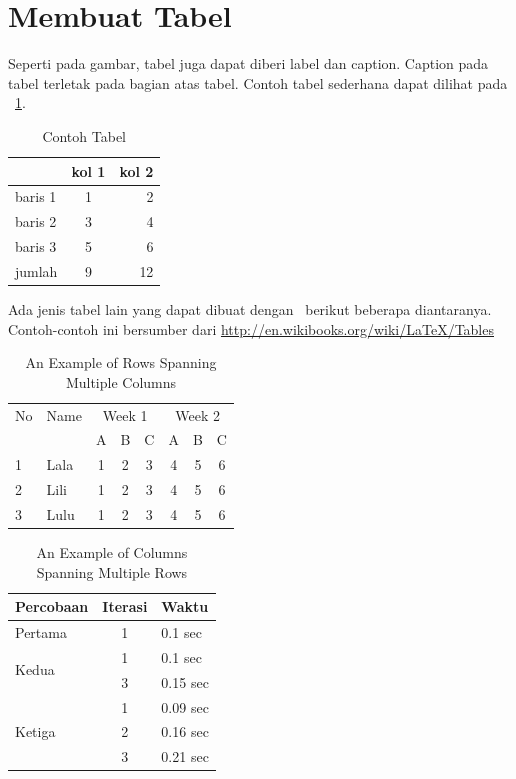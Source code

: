 \section{Membuat Tabel}
Seperti pada gambar, tabel juga dapat diberi label dan caption. 
Caption pada tabel terletak pada bagian atas tabel. 
Contoh tabel sederhana dapat dilihat pada \tab~\ref{tab:tab1}.

\begin{table}
	\centering
	\caption{Contoh Tabel}
	\label{tab:tab1}
	\begin{tabular}{| l | c r |}
		\hline
		& kol 1 & kol 2 \\ 
		\hline
		baris 1 & 1 & 2 \\
		baris 2 & 3 & 4 \\
		baris 3 & 5 & 6 \\
		jumlah  & 9 & 12 \\
		\hline
	\end{tabular}
\end{table}

Ada jenis tabel lain yang dapat dibuat dengan \latex~berikut 
beberapa diantaranya. 
Contoh-contoh ini bersumber dari 
\url{http://en.wikibooks.org/wiki/LaTeX/Tables}

\begin{table}
	\centering
	\caption{An Example of Rows Spanning Multiple Columns}
	\label{row.spanning}
	\begin{tabular}{|l|l|*{6}{c|}}
  		\hline %
  		No & Name & \multicolumn{3}{|c|}{Week 1} & \multicolumn{3}{|c|}{Week 2} \\
  		\cline{3-8} %
  		& & A & B & C & A & B & C\\
  		\hline
  		1 & Lala & 1 & 2 & 3 & 4 & 5 & 6\\
  		2 & Lili & 1 & 2 & 3 & 4 & 5 & 6\\
  		3 & Lulu & 1 & 2 & 3 & 4 & 5 & 6\\
  		\hline
	\end{tabular}
\end{table}

\begin{table}
	\centering
	\caption{An Example of Columns Spanning Multiple Rows}
	\label{column.spanning}
	\begin{tabular}{|l|c|l|}
		\hline
		Percobaan & Iterasi & Waktu \\
		\hline
		Pertama & 1 & 0.1 sec \\ \hline
		\multirow{2}{*}{Kedua} & 1 & 0.1 sec \\
 		& 3 & 0.15 sec \\ 
 		\hline
		\multirow{3}{*}{Ketiga} & 1 & 0.09 sec \\
 		& 2 & 0.16 sec \\
 		& 3 & 0.21 sec \\ 
 		\hline
	\end{tabular}
\end{table}

